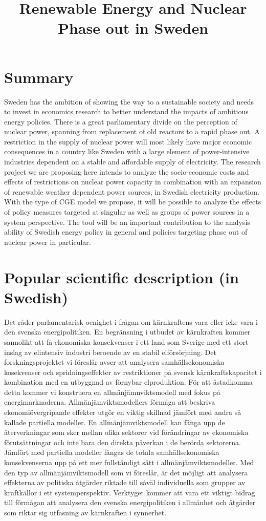 \documentclass[10pt,a4paper]{article}
\begin{document}
\title{Renewable Energy and Nuclear Phase out in Sweden}
\date{}
\author{}
\maketitle

\section{Summary}
Sweden has the ambition of showing the way to a sustainable society and needs to invest in economics research to better understand the impacts of ambitious energy policies. There is a great parliamentary divide on the perception of nuclear power, spanning from replacement of old reactors to a rapid phase out. A restriction in the supply of nuclear power will most likely have major economic consequences in a country like Sweden with a large element of power-intensive industries dependent on a stable and affordable supply of electricity. The research project we are proposing here intends to analyze the socio-economic costs and effects of restrictions on nuclear power capacity in combination with an expansion of renewable weather dependent power sources, in Swedish electricity production. With the type of CGE model we propose, it will be possible to analyze the effects of policy measures targeted at singular as well as groups of power sources in a system perspective. The tool will be an important contribution to the analysis ability of Swedish energy policy in general and policies targeting phase out of nuclear power in particular.
\section{Popular scientific description (in Swedish)}
Det råder parlamentarisk oenighet i frågan om kärnkraftens vara eller icke vara i den svenska energipolitiken. En begränsning i utbudet av kärnkraften kommer sannolikt att få ekonomiska konsekvenser i ett land som Sverige med ett stort inslag av elintensiv industri beroende av en stabil elförsörjning. Det forskningsprojektet vi föreslår avser att analysera samhällsekonomiska kosekvenser och spridningseffekter av restriktioner på svensk kärnkraftskapacitet i kombination med en utbyggnad av förnybar elproduktion. För att åstadkomma detta kommer vi konstruera en allmänjämnviktsmodell med fokus på energimarknaderna. Allmänjämviktsmodellers förmåga att beskriva ekonomiövergripande effekter utgör en viktig skillnad jämfört med andra så kallade partiella modeller. En allmänjämviktsmodell kan fånga upp de återverkningar som sker mellan olika sektorer vid förändringar av ekonomiska förutsättningar och inte bara den direkta påverkan i de berörda sektorerna. Jämfört med partiella modeller fångas de totala samhällsekonomiska konsekvenserna upp på ett mer fullständigt sätt i allmänjämviktsmodeller. Med den typ av allmänjämviktsmodell som vi föreslår, är det möjligt att analysera effekterna av politiska åtgärder riktade till såväl individuella som grupper av kraftkällor i ett systemperspektiv. Verktyget kommer att vara ett viktigt bidrag till förmågan att analysera den svenska energipolitiken i allmänhet och åtgärder som riktar sig utfasning av kärnkraften i synnerhet.
\end{document}

